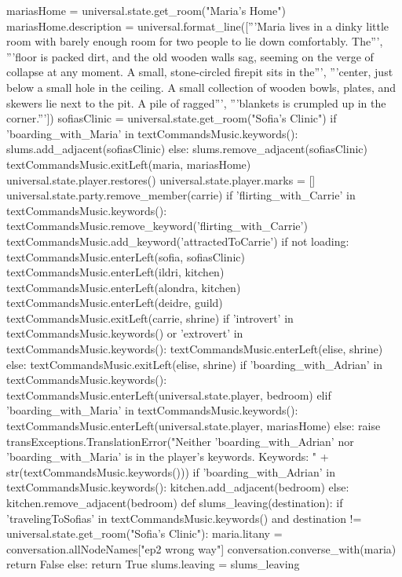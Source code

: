 \documentclass{book}
\begin{document}
\begin{openScene}
    mariasHome = universal.state.get_room("Maria's Home")
    mariasHome.description = universal.format_line(['''Maria lives in a dinky little room with barely enough room for two people to lie down comfortably. The''',
    '''floor is packed dirt, and the old wooden walls sag, seeming on the verge of collapse at any moment. A small, stone-circled firepit sits in the''',
    '''center, just below a small hole in the ceiling. A small collection of wooden bowls, plates, and  skewers lie next to the pit. A pile of ragged''',
    '''blankets is crumpled up in the corner.'''])
    sofiasClinic = universal.state.get_room("Sofia's Clinic")
    if 'boarding_with_Maria' in textCommandsMusic.keywords():
        slums.add_adjacent(sofiasClinic)
    else:
        slums.remove_adjacent(sofiasClinic)
        textCommandsMusic.exitLeft(maria, mariasHome)
    universal.state.player.restores()
    universal.state.player.marks = []
    universal.state.party.remove_member(carrie)
    if 'flirting_with_Carrie' in textCommandsMusic.keywords():
        textCommandsMusic.remove_keyword('flirting_with_Carrie')
        textCommandsMusic.add_keyword('attractedToCarrie')
    if not loading:
        textCommandsMusic.enterLeft(sofia, sofiasClinic)
        textCommandsMusic.enterLeft(ildri, kitchen)
        textCommandsMusic.enterLeft(alondra, kitchen)
        textCommandsMusic.enterLeft(deidre, guild)
        textCommandsMusic.exitLeft(carrie, shrine)
        if 'introvert' in textCommandsMusic.keywords() or 'extrovert' in textCommandsMusic.keywords():
            textCommandsMusic.enterLeft(elise, shrine)
        else:
            textCommandsMusic.exitLeft(elise, shrine)
        if 'boarding_with_Adrian' in textCommandsMusic.keywords():
            textCommandsMusic.enterLeft(universal.state.player, bedroom)
        elif 'boarding_with_Maria' in textCommandsMusic.keywords():
            textCommandsMusic.enterLeft(universal.state.player, mariasHome)
        else:
            raise transExceptions.TranslationError("Neither 'boarding_with_Adrian' nor 'boarding_with_Maria' is in the player's keywords. Keywords: " + str(textCommandsMusic.keywords()))
    if 'boarding_with_Adrian' in textCommandsMusic.keywords():
        kitchen.add_adjacent(bedroom)
    else:
        kitchen.remove_adjacent(bedroom)
    def slums_leaving(destination):
        if 'travelingToSofias' in textCommandsMusic.keywords() and destination != universal.state.get_room("Sofia's Clinic"):
            maria.litany = conversation.allNodeNames["ep2 wrong way"]
            conversation.converse_with(maria)
            return False
        else:
            return True
    slums.leaving = slums_leaving
    
\end{openScene}
\end{document}
